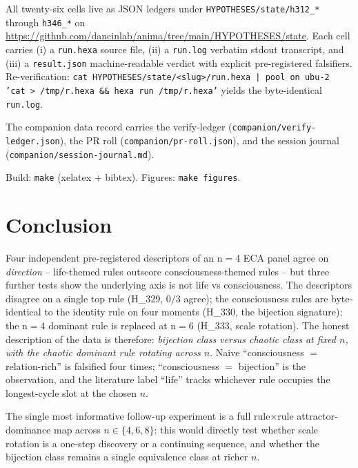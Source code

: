 \documentclass[11pt,a4paper]{article}
\begin{document}
All twenty-six cells live as JSON ledgers under
\texttt{HYPOTHESES/state/h312\_*} through
\texttt{h346\_*} on
\url{https://github.com/dancinlab/anima/tree/main/HYPOTHESES/state}.
Each cell carries (i) a \texttt{run.hexa} source file, (ii) a
\texttt{run.log} verbatim stdout transcript, and (iii) a
\texttt{result.json} machine-readable verdict with explicit
pre-registered falsifiers. Re-verification:
\texttt{cat HYPOTHESES/state/<slug>/run.hexa | pool on ubu-2 'cat
> /tmp/r.hexa \&\& hexa run /tmp/r.hexa'}
yields the byte-identical \texttt{run.log}.

The companion data record carries the verify-ledger
(\texttt{companion/verify-ledger.json}), the PR roll
(\texttt{companion/pr-roll.json}), and the session journal
(\texttt{companion/session-journal.md}).

Build: \texttt{make} (xelatex + bibtex). Figures: \texttt{make figures}.

\section{Conclusion}
\label{sec:conclusion}

Four independent pre-registered descriptors of an n$=$4 ECA panel agree
on \emph{direction} -- life-themed rules outscore consciousness-themed
rules -- but three further tests show the underlying axis is not
life vs consciousness. The descriptors disagree on a single top rule
(H\_329, $0/3$ agree); the consciousness rules are byte-identical to
the identity rule on four moments (H\_330, the bijection signature);
the n$=$4 dominant rule is replaced at n$=$6 (H\_333, scale rotation).
The honest description of the data is therefore:
\emph{bijection class versus chaotic class at fixed $n$, with the
chaotic dominant rule rotating across $n$}. Naive
``consciousness $=$ relation-rich'' is falsified
four times; ``consciousness $=$ bijection'' is the
observation, and the literature label ``life'' tracks
whichever rule occupies the longest-cycle slot at the chosen $n$.

The single most informative follow-up experiment is a full
rule$\times$rule attractor-dominance map across $n \in \{4, 6, 8\}$:
this would directly test whether scale rotation is a one-step
discovery or a continuing sequence, and whether the bijection class
remains a single equivalence class at richer $n$.

\end{document}
